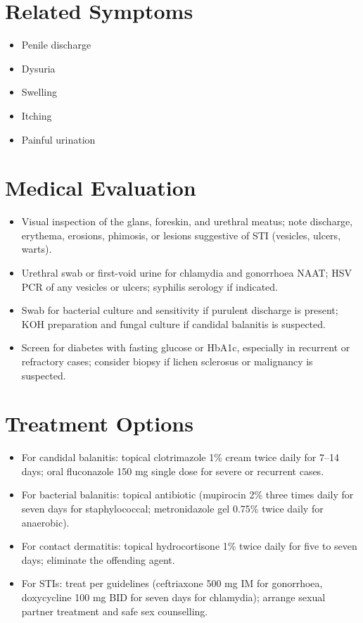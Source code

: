\section*{Related Symptoms}
\begin{itemize}
  \item Penile discharge
  \item Dysuria
  \item Swelling
  \item Itching
  \item Painful urination
\end{itemize}

\section*{Medical Evaluation}
\begin{itemize}
  \item Visual inspection of the glans, foreskin, and urethral meatus; note discharge, erythema, erosions, phimosis, or lesions suggestive of STI (vesicles, ulcers, warts).
  \item Urethral swab or first-void urine for chlamydia and gonorrhoea NAAT; HSV PCR of any vesicles or ulcers; syphilis serology if indicated.
  \item Swab for bacterial culture and sensitivity if purulent discharge is present; KOH preparation and fungal culture if candidal balanitis is suspected.
  \item Screen for diabetes with fasting glucose or HbA1c, especially in recurrent or refractory cases; consider biopsy if lichen sclerosus or malignancy is suspected.
\end{itemize}

\section*{Treatment Options}
\begin{itemize}
  \item For candidal balanitis: topical clotrimazole 1\% cream twice daily for 7--14 days; oral fluconazole 150 mg single dose for severe or recurrent cases.
  \item For bacterial balanitis: topical antibiotic (mupirocin 2\% three times daily for seven days for staphylococcal; metronidazole gel 0.75\% twice daily for anaerobic).
  \item For contact dermatitis: topical hydrocortisone 1\% twice daily for five to seven days; eliminate the offending agent.
  \item For STIs: treat per guidelines (ceftriaxone 500 mg IM for gonorrhoea, doxycycline 100 mg BID for seven days for chlamydia); arrange sexual partner treatment and safe sex counselling.
\end{itemize}

